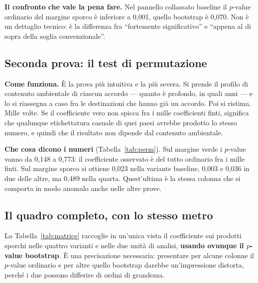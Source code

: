 \documentclass[11pt,a4paper]{article}
\begin{document}
\textbf{Il confronto che vale la pena fare.} Nel pannello collassato baseline il $p$-value
ordinario del margine sporco \`e inferiore a 0,001, quello bootstrap \`e 0,070. Non \`e un
dettaglio tecnico: \`e la differenza fra ``fortemente significativo'' e ``appena al di
sopra della soglia convenzionale''.



\clearpage
\subsection{Seconda prova: il test di permutazione}

\textbf{Come funziona.} \`E la prova pi\`u intuitiva e la pi\`u severa. Si prende il
profilo di contenuto ambientale di ciascun accordo --- quanto \`e profondo, in quali anni
--- e lo si riassegna a caso fra le destinazioni che hanno gi\`a un accordo. Poi si
ristima. Mille volte. Se il coefficiente vero non spicca fra i mille coefficienti finti,
significa che qualunque etichettatura casuale di quei paesi avrebbe prodotto lo stesso
numero, e quindi che il risultato non dipende dal contenuto ambientale.

\textbf{Che cosa dicono i numeri} (Tabella~\ref{tab:perm}). Sul margine verde i $p$-value
vanno da 0,148 a 0,773: il coefficiente osservato \`e del tutto ordinario fra i mille
finti. Sul margine sporco si ottiene 0,023 nella variante baseline, 0,003 e 0,036 in due
delle altre, ma 0,489 nella quarta. Quest'ultima \`e la stessa colonna che si comporta in
modo anomalo anche nelle altre prove.



\clearpage
\subsection{Il quadro completo, con lo stesso metro}

La Tabella~\ref{tab:matrice} raccoglie in un'unica vista il coefficiente sui prodotti
sporchi nelle quattro varianti e nelle due unit\`a di analisi, \textbf{usando ovunque il
$p$-value bootstrap}. \`E una precisazione necessaria: presentare per alcune colonne il
$p$-value ordinario e per altre quello bootstrap darebbe un'impressione distorta, perch\'e
i due possono differire di ordini di grandezza.
\end{document}
